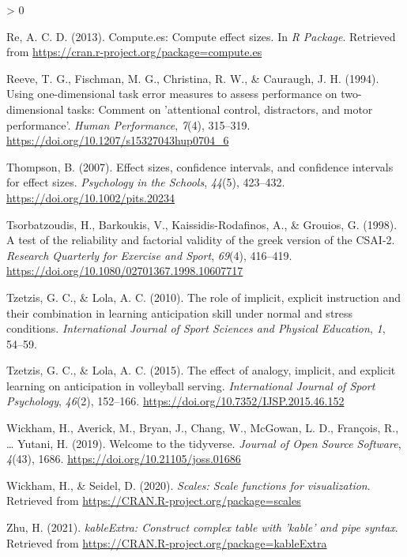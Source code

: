 \documentclass[
  english,
  man, donotrepeattitle,floatsintext]{apa7}
\newlength{\cslhangindent}
\newenvironment{CSLReferences}[2] %
 {%
  \setlength{\parindent}{0pt}
  \ifodd #1 \everypar{\setlength{\hangindent}{\cslhangindent}}\ignorespaces\fi
  \ifnum #2 > 0
  \setlength{\parskip}{#2\baselineskip}
  \fi
 }%
 {}
\begin{document}
\begin{CSLReferences}{1}{0}
\leavevmode\hypertarget{ref-R-compute.es}{}%
Re, A. C. D. (2013). Compute.es: Compute effect sizes. In \emph{R Package}. Retrieved from \url{https://cran.r-project.org/package=compute.es}

\leavevmode\hypertarget{ref-reeve1994}{}%
Reeve, T. G., Fischman, M. G., Christina, R. W., \& Cauraugh, J. H. (1994). Using one-dimensional task error measures to assess performance on two-dimensional tasks: Comment on 'attentional control, distractors, and motor performance'. \emph{Human Performance}, \emph{7}(4), 315--319. \url{https://doi.org/10.1207/s15327043hup0704_6}

\leavevmode\hypertarget{ref-thompson2007}{}%
Thompson, B. (2007). Effect sizes, confidence intervals, and confidence intervals for effect sizes. \emph{Psychology in the Schools}, \emph{44}(5), 423--432. \url{https://doi.org/10.1002/pits.20234}

\leavevmode\hypertarget{ref-tsorbatzoudis1998}{}%
Tsorbatzoudis, H., Barkoukis, V., Kaissidis-Rodafinos, A., \& Grouios, G. (1998). A test of the reliability and factorial validity of the greek version of the CSAI-2. \emph{Research Quarterly for Exercise and Sport}, \emph{69}(4), 416--419. \url{https://doi.org/10.1080/02701367.1998.10607717}

\leavevmode\hypertarget{ref-tzetzis2010}{}%
Tzetzis, G. C., \& Lola, A. C. (2010). The role of implicit, explicit instruction and their combination in learning anticipation skill under normal and stress conditions. \emph{International Journal of Sport Sciences and Physical Education}, \emph{1}, 54--59.

\leavevmode\hypertarget{ref-tzetzis2015}{}%
Tzetzis, G. C., \& Lola, A. C. (2015). The effect of analogy, implicit, and explicit learning on anticipation in volleyball serving. \emph{International Journal of Sport Psychology}, \emph{46}(2), 152--166. \url{https://doi.org/10.7352/IJSP.2015.46.152}

\leavevmode\hypertarget{ref-R-tidyverse}{}%
Wickham, H., Averick, M., Bryan, J., Chang, W., McGowan, L. D., François, R., \ldots{} Yutani, H. (2019). Welcome to the {tidyverse}. \emph{Journal of Open Source Software}, \emph{4}(43), 1686. \url{https://doi.org/10.21105/joss.01686}

\leavevmode\hypertarget{ref-R-scales}{}%
Wickham, H., \& Seidel, D. (2020). \emph{Scales: Scale functions for visualization}. Retrieved from \url{https://CRAN.R-project.org/package=scales}

\leavevmode\hypertarget{ref-R-kableExtra}{}%
Zhu, H. (2021). \emph{kableExtra: Construct complex table with 'kable' and pipe syntax}. Retrieved from \url{https://CRAN.R-project.org/package=kableExtra}

\end{CSLReferences}
\end{document}
